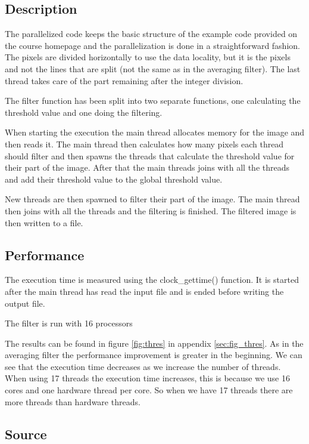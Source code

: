 \documentclass[a4paper, 12pt]{article}
\begin{document}
\subsection{Description}
\label{sec:desc2}
The parallelized code keeps the basic structure of the example code provided on
the course homepage and the parallelization is done in a straightforward
fashion. The pixels are divided horizontally to use the data locality, but it is
the pixels and not the lines that are split (not the same as in the averaging
filter). The last thread takes care of the part remaining after the integer
division.

The filter function has been split into two separate functions, one calculating
the threshold value and one doing the filtering.

When starting the execution the main thread allocates memory for the image and
then reads it. The main thread then calculates how many pixels each thread
should filter and then spawns the threads that calculate the threshold value for
their part of the image. After that the main threads joins with all the threads
and add their threshold value to the global threshold value.

New threads are then spawned to filter their part of the image. The main thread
then joins with all the threads and the filtering is finished. The filtered
image is then written to a file.

\subsection{Performance}

The execution time is measured using the clock\_gettime() function. It is
started after the main thread has read the input file and is ended before
writing the output file.

The filter is run with 16 processors

The results can be found in figure \ref{fig:thres} in appendix
\ref{sec:fig_thres}. As in the averaging filter the performance improvement is
greater in the beginning. We can see that the execution time decreases as we
increase the number of threads. When using 17 threads the execution time
increases, this is because we use 16 cores and one hardware thread per core. So
when we have 17 threads there are more threads than hardware threads.

\subsection{Source}
\end{document}
